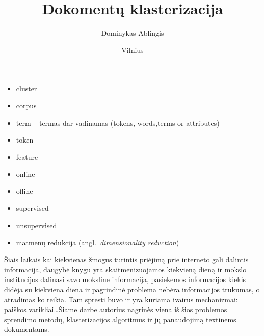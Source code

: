 \documentclass{VUMIFInfKursinis}
\title{Dokomentų klasterizacija}
\author{Dominykas Ablingis}
\date{Vilnius \\ \the\year}
\newif\iffast{} %
\begin{document}
\iffast{}
	\newcommand{\rewrite}[1]{\todo[linecolor=red,backgroundcolor=red!25,bordercolor=red]{#1}}
	\newcommand{\needsource}[1]{\todo[linecolor=blue,backgroundcolor=blue!25,bordercolor=blue,]{#1}}
	\newcommand{\toadd}[1]{\todo[linecolor=OliveGreen,backgroundcolor=OliveGreen!25,bordercolor=OliveGreen,]{#1}}
	\newcommand{\note}[1]{\todo[linecolor=Plum,backgroundcolor=Plum!25,bordercolor=Plum]{#1}}
	\newcommand{\thiswillnotshow}[1]{\todo[disable]{#1}}
	\listoftodos[Notes]
\else
	\newcommand{\rewrite}[1]{}
	\newcommand{\needsource}[1]{}
	\newcommand{\toadd}[1]{}
	\newcommand{\note}[1]{}
	\newcommand{\thiswillnotshow}[1]{}
\fi

\maketitle
\tableofcontents


\newcommand{\ltang}[2]{#1 (angl.\  \textit{#2}) }
\newcommand{\BigO}[1]{$\mathcal{O}(#1)$}

\begin{itemize}
	\item cluster
	\item corpus
	\item term – termas dar vadinamas (tokens, words,terms or attributes)
	\item token
	\item feature
	\item online
	\item ofline
	\item supervised
	\item unsupervised
	\item \ltang{matmenų redukcija}{dimensionality reduction}
\end{itemize}

Šiais laikais kai kiekvienas žmogus turintis priėjimą prie interneto gali dalintis informacija, daugybė knygu yra skaitmenizuojamos kiekvieną dieną ir mokslo institucijos dalinasi savo moksline informacija, pasiekemos informacijos kiekis didėja su kiekviena diena ir pagrindinė problema nebėra informacijos trūkumas, o atradimas ko reikia. Tam spresti buvo ir yra kuriama ivairūs mechanizmai: paiškos varikliai\ldots Šiame darbe autorius nagrinės viena iš šios problemos sprendimo metodų, klasterizacijos algoritmus ir jų panaudojimą textinems dokumentams. %
\end{document}
